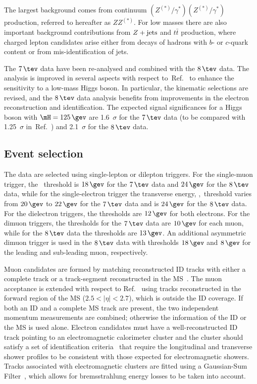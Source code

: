 \documentclass[final,3p,times,twocolumn]{elsarticle}
\begin{document}
  The largest background comes from continuum
  $(Z^{(*)}/\gamma^{*}) (Z^{(*)}/\gamma^{*})$ production, referred to
  hereafter as $ZZ^{(*)}$. For low masses there are also important
  background contributions from $Z+\rm{jets}$ and $t\bar{t}$
  production, where charged lepton candidates arise either from decays
  of hadrons with $b$- or $c$-quark content or from mis-identification
  of jets.

  The $7\,\tev$ data have been re-analysed and combined with the
  $8\,\tev$ data. The analysis is improved in several aspects
  with respect to~Ref.~\cite{ATLAS:2012ac} to enhance the sensitivity
  to a low-mass Higgs boson. In particular, the kinematic selections
  are revised, and the $8\,\tev$ data analysis benefits from
  improvements in the electron reconstruction and
  identification. The expected signal significances for a Higgs boson with
  $\mH=125\,\gev$ are 
  1.6~$\sigma$ for the $7\,\tev$ data (to be compared
  with 1.25~$\sigma$ in~Ref.~\cite{ATLAS:2012ac}) and 2.1~$\sigma$ for the 
  $8\,\tev$ data.
  
  \subsection{Event selection} 

  The data are selected using single-lepton
  or dilepton triggers. For the single-muon trigger, the \pt~threshold is $18\,\gev$ for the $7\,\tev$ data
  and $24\,\gev$ for the $8\,\tev$ data, while for the
  single-electron trigger the transverse energy, \et,~threshold 
  varies from $20\,\gev$ to $22\,\gev$ for the $7\,\tev$ data 
  and is $24\,\gev$ for the $8\,\tev$ data. For the dielectron triggers, the
  thresholds are $12\,\gev$ for both electrons. For
  the dimuon triggers, the thresholds for the $7\,\tev$ data are
  $10\,\gev$ for each muon, while for the $8\,\tev$ data the thresholds are 
  $13\,\gev$. An additional asymmetric dimuon trigger is used in the $8\,\tev$ data 
  with thresholds  $18\,\gev$ and $8\,\gev$ for the leading and sub-leading muon, respectively.

  Muon candidates are formed by matching reconstructed ID
  tracks with either a complete track or a track-segment reconstructed in the
  MS~\cite{ATLAS-CONF-2011-063}. The muon
  acceptance is extended with respect to Ref.~\cite{ATLAS:2012ac} 
  using tracks reconstructed in the forward region
  of the MS  ($2.5<|\eta|<2.7$), which is outside the ID coverage. 
  If both an ID and a complete MS track are 
  present, the two independent momentum measurements are combined;
  otherwise the information of the ID or the MS is used alone.
  Electron candidates must have a
  well-reconstructed ID track pointing to an electromagnetic calorimeter cluster
  and the cluster should satisfy a set of identification
  criteria~\cite{Aad:2011mk} that require the longitudinal and
  transverse shower profiles to be consistent with those expected for
  electromagnetic showers. Tracks associated with
  electromagnetic clusters are fitted using a Gaussian-Sum
  Filter~\cite{GSFConf}, which allows for
  bremsstrahlung energy losses to be taken into account.
\end{document}
